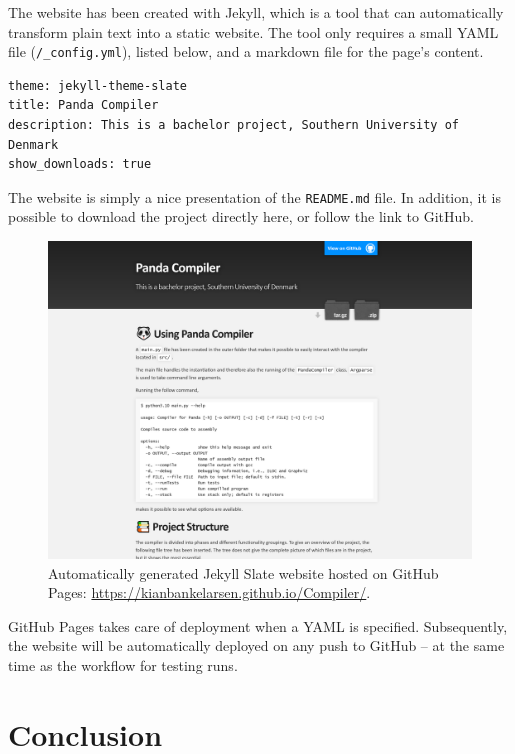 The website has been created with Jekyll, which is a tool that can automatically transform plain text into a static website. The tool only requires a small YAML file (\texttt{/\_config.yml}), listed below, and a markdown file for the page's content.

\begin{verbatim}
theme: jekyll-theme-slate
title: Panda Compiler
description: This is a bachelor project, Southern University of Denmark
show_downloads: true
\end{verbatim}

The website is simply a nice presentation of the \texttt{README.md} file. In addition, it is possible to download the project directly here, or follow the link to GitHub.

\begin{figure}[H]
    \centering
    \includegraphics[width=1\textwidth]{misc/images/GitHub_Pages.png}
    \caption{Automatically generated Jekyll Slate website hosted on GitHub Pages: \url{https://kianbankelarsen.github.io/Compiler/}.}
    \label{fig:GitHub_Pages}
\end{figure}

GitHub Pages takes care of deployment when a YAML is specified. Subsequently, the website will be automatically deployed on any push to GitHub -- at the same time as the workflow for testing runs.

\chapter{Conclusion}

\cleardoublepage
{}
{}
\printbibliography
